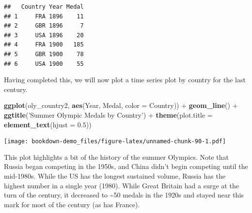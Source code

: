\documentclass[]{book}
\newenvironment{Shaded}{\begin{snugshade}}{\end{snugshade}}
\newcommand{\KeywordTok}[1]{\textcolor[rgb]{0.13,0.29,0.53}{\textbf{{#1}}}}
\newcommand{\DataTypeTok}[1]{\textcolor[rgb]{0.13,0.29,0.53}{{#1}}}
\newcommand{\FloatTok}[1]{\textcolor[rgb]{0.00,0.00,0.81}{{#1}}}
\newcommand{\StringTok}[1]{\textcolor[rgb]{0.31,0.60,0.02}{{#1}}}
\newcommand{\CommentTok}[1]{\textcolor[rgb]{0.56,0.35,0.01}{\textit{{#1}}}}
\newcommand{\NormalTok}[1]{{#1}}
\begin{document}
\begin{Shaded}
\end{Shaded}

\begin{verbatim}
##   Country Year Medal
## 1     FRA 1896    11
## 2     GBR 1896     7
## 3     USA 1896    20
## 4     FRA 1900   185
## 5     GBR 1900    78
## 6     USA 1900    55
\end{verbatim}

Having completed this, we will now plot a time series plot by country
for the last century.

\begin{Shaded}
\begin{Highlighting}[]
\KeywordTok{ggplot}\NormalTok{(oly_country2, }\KeywordTok{aes}\NormalTok{(Year, Medal, }\DataTypeTok{color =} \NormalTok{Country)) +}\StringTok{ }
\StringTok{  }\KeywordTok{geom_line}\NormalTok{() +}\StringTok{ }\KeywordTok{ggtitle}\NormalTok{(}\StringTok{'Summer Olympic Medals by Country'}\NormalTok{) +}\StringTok{ }
\StringTok{  }\KeywordTok{theme}\NormalTok{(}\DataTypeTok{plot.title =} \KeywordTok{element_text}\NormalTok{(}\DataTypeTok{hjust =} \FloatTok{0.5}\NormalTok{))}
\end{Highlighting}
\end{Shaded}

\texttt{[image: bookdown-demo\_files/figure-latex/unnamed-chunk-90-1.pdf]}

This plot highlights a bit of the history of the summer Olympics. Note
that Russia began competing in the 1950s, and China didn't begin
competing until the mid-1980s. While the US has the longest sustained
volume, Russia has the highest number in a single year (1980). While
Great Britain had a surge at the turn of the century, it decreased to
\textasciitilde{}50 medals in the 1920s and stayed near this mark for
most of the century (as has France).
\end{document}
